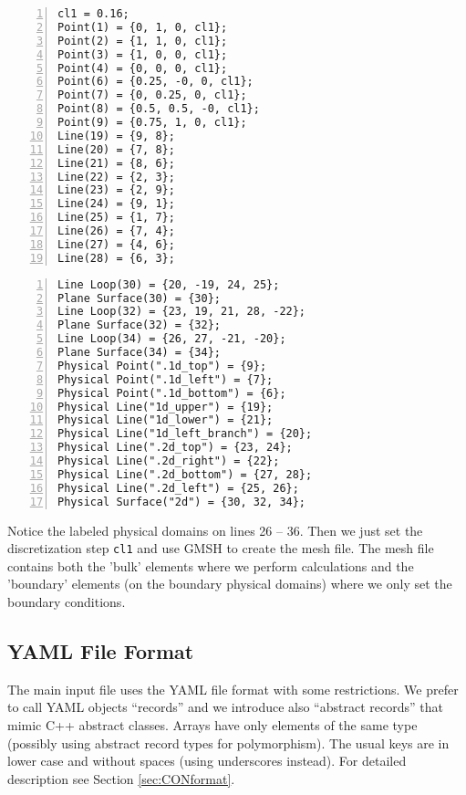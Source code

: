 \begin{multicols}{2}
{\small
\begin{Verbatim}[numbers=left]
cl1 = 0.16;
Point(1) = {0, 1, 0, cl1};
Point(2) = {1, 1, 0, cl1};
Point(3) = {1, 0, 0, cl1};
Point(4) = {0, 0, 0, cl1};
Point(6) = {0.25, -0, 0, cl1};
Point(7) = {0, 0.25, 0, cl1};
Point(8) = {0.5, 0.5, -0, cl1};
Point(9) = {0.75, 1, 0, cl1};
Line(19) = {9, 8};
Line(20) = {7, 8};
Line(21) = {8, 6};
Line(22) = {2, 3};
Line(23) = {2, 9};
Line(24) = {9, 1};
Line(25) = {1, 7};
Line(26) = {7, 4};
Line(27) = {4, 6};
Line(28) = {6, 3};
\end{Verbatim}
\columnbreak
\begin{Verbatim}[numbers=left, firstnumber=last]
Line Loop(30) = {20, -19, 24, 25};
Plane Surface(30) = {30};
Line Loop(32) = {23, 19, 21, 28, -22};
Plane Surface(32) = {32};
Line Loop(34) = {26, 27, -21, -20};
Plane Surface(34) = {34};
Physical Point(".1d_top") = {9};
Physical Point(".1d_left") = {7};
Physical Point(".1d_bottom") = {6};
Physical Line("1d_upper") = {19};
Physical Line("1d_lower") = {21};
Physical Line("1d_left_branch") = {20};
Physical Line(".2d_top") = {23, 24};
Physical Line(".2d_right") = {22};
Physical Line(".2d_bottom") = {27, 28};
Physical Line(".2d_left") = {25, 26};
Physical Surface("2d") = {30, 32, 34};
\end{Verbatim}
}
\end{multicols}

Notice the labeled physical domains on lines 26 -- 36. Then we just set the discretization step \verb'cl1' and use GMSH to create the mesh file.
The mesh file contains both the 'bulk' elements where we perform calculations and the 'boundary' elements (on the boundary physical domains) where we only set the boundary conditions.

\subsection{YAML File Format}
The main input file uses the YAML file format with some restrictions. 
We prefer to call YAML objects ``records'' and we introduce also ``abstract records''
that mimic C++ abstract classes.
Arrays have only elements of the same type (possibly using abstract record types for polymorphism). 
The usual keys are in lower case and without spaces (using underscores instead).
For detailed description see Section \ref{sec:CONformat}.


